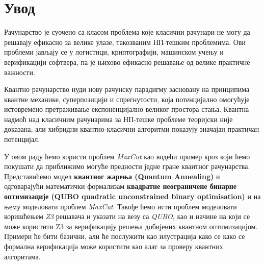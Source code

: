 \section{Увод}
\label{sec:uvod}

Рачунарство је суочено са класом проблема које класични рачунари
не могу да решавају ефикасно за велике улазе, такозваним НП-тешким
проблемима. Ови проблеми јављају се у логистици, криптографији,
машинском учењу и верификацији софтвера, па је њихово ефикасно решавање
од велике практичне важности.


Квантно рачунарство нуди нову рачунску парадигму засновану на принципима
квантне механике, суперпозицији и спрегнутости, која потенцијално
омогућује истовремено претраживање експоненцијално великог простора стања.
Квантна надмоћ над класичним рачунарима за НП-тешке проблеме
теоријски није доказана, али хибридни квантно-класични алгоритми показују
значајан практичан потенцијал.

У овом раду ћемо користи проблем \textit{MaxCut} као водећи пример кроз који
ћемо покушати да приближимо могуће предности једне гране квантног рачунарства.
Представићемо модел \textbf{квантног жарења (Quantum Annealing)} и одговарајући математички формализам 
 \textbf{квадратне неограничене бинарне оптимизације (QUBO quadratic unconstrained binary optimisation)}
и на њему моделовати проблем \textit{MaxCut}. Такође ћемо исти проблем моделовати
коришћењем \textit{Z3} решавача и указати на везу са \textit{QUBO}, као и начине на који се
може користити Z3 за верификацију решења добијених квантном оптимизацијом. Примери ће бити базични, али ће послужити као илустрација како се 
како се формална верификација може користити као алат за проверу квантних алгоритама.